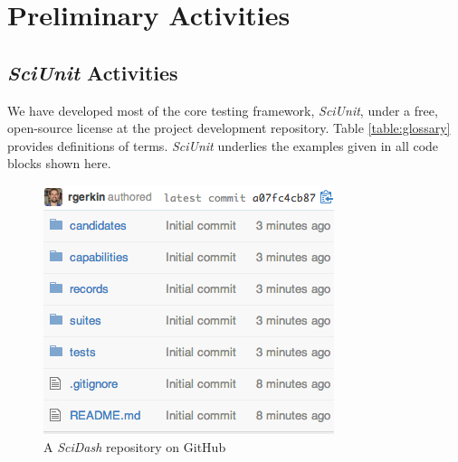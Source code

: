 \documentclass[11pt,letterpaper]{article}
\begin{document}
\section{Preliminary Activities}

\subsection{\textit{SciUnit} Activities} We have developed most of the core testing framework, \textit{SciUnit}, under a free, open-source license at the project development repository\cite{sciunit_url}. Table \ref{table:glossary} provides definitions of terms.  \textit{SciUnit} underlies the examples given in all code blocks shown here.  

\begin{figure}
\includegraphics[scale=0.7]{scidash_github.png}
\caption{A \textit{SciDash} repository on GitHub}
\label{fig:scidash_repo}
\end{figure}
\vspace{-10px}
\leavevmode
{} 
\end{document}
